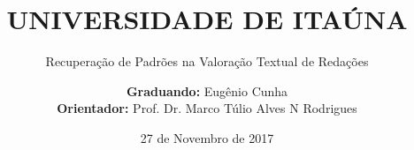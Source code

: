 \title{UNIVERSIDADE DE ITAÚNA}
\subtitle{Recuperação de Padrões na Valoração Textual de Redações}
\date{27 de Novembro de 2017}
\author{\textbf{Graduando:} Eugênio Cunha \\ \textbf{Orientador:} Prof. Dr. Marco Túlio Alves N Rodrigues}
